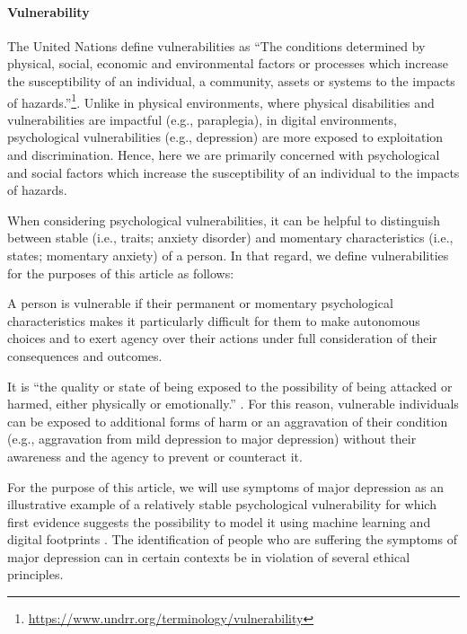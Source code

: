 \documentclass[11pt,theapa]{article}
\theoremstyle{plain}
\begin{document}
\paragraph{Vulnerability}
The United Nations define vulnerabilities as ``The conditions determined by physical, social, economic and environmental factors or processes which increase the susceptibility of an individual, a community, assets or systems to the impacts of hazards.''\footnote{\url{https://www.undrr.org/terminology/vulnerability}}. Unlike in physical environments, where physical disabilities and vulnerabilities are impactful (e.g., paraplegia), in digital environments, psychological vulnerabilities (e.g., depression) are more exposed to exploitation and discrimination. Hence, here we are primarily concerned with psychological and social factors which increase the susceptibility of an individual to the impacts of hazards. 

When considering  psychological vulnerabilities, it can be helpful to distinguish between stable (i.e., traits; anxiety disorder) and momentary characteristics (i.e., states; momentary anxiety) of a person. In that regard, we define vulnerabilities for the purposes of this article as follows: 
\begin{description}
\item \noindent A person is vulnerable if their permanent or momentary psychological characteristics makes it particularly difficult for them to make autonomous choices and to exert agency over their actions under full consideration of their consequences and outcomes.
\end{description}

It is ``the quality or state of being exposed to the possibility of being attacked or harmed, either physically or emotionally.'' \cite{lexico}. For this reason, vulnerable individuals can be exposed to additional forms of harm or an aggravation of their condition (e.g., aggravation from mild depression to major depression) without their awareness and the agency to prevent or counteract it.

For the purpose of this article, we will use symptoms of major depression \cite{Dsm5} as an illustrative example of a relatively stable psychological vulnerability for which first evidence suggests the possibility to model it using machine learning and digital footprints \cite{Liu2022,Mueller2021}. The identification of people who are suffering the symptoms of major depression can in certain contexts be in violation of several ethical principles.
\end{document}
